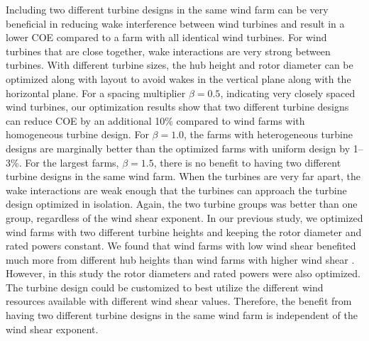 \documentclass[WESD, manuscript]{copernicus}
\begin{document}
Including two different turbine designs in the same wind farm can be very beneficial in reducing wake interference between wind turbines and result in a lower COE compared to a farm with all identical wind turbines. For wind turbines that are close together, wake interactions are very strong between turbines. With different turbine sizes, the hub height and rotor diameter can be optimized along with layout to avoid wakes in the vertical plane along with the horizontal plane. For a spacing multiplier $\beta=0.5$, indicating very closely spaced wind turbines, our optimization results show that two different turbine designs can reduce COE by an additional 10\% compared to wind farms with homogeneous turbine design. For $\beta=1.0$, the farms with heterogeneous turbine designs are marginally better than the optimized farms with uniform design by 1--3\%. For the largest farms, $\beta=1.5$, there is no benefit to having two different turbine designs in the same wind farm. When the turbines are very far apart, the wake interactions are weak enough that the turbines can approach the turbine design optimized in isolation.  Again, the two turbine groups was  better than one group, regardless of the wind shear exponent. In our previous study, we optimized wind farms with two different turbine heights and keeping the rotor diameter and rated powers constant. We found that wind farms with low wind shear benefited much more from different hub heights than wind farms with higher wind shear \citep{stanley2018}. However, in this study the rotor diameters and rated powers were also optimized. The turbine design could be customized to best utilize the different wind resources available with different wind shear values. Therefore, the benefit from having two different turbine designs in the same wind farm is independent of the wind shear exponent.
\end{document}
